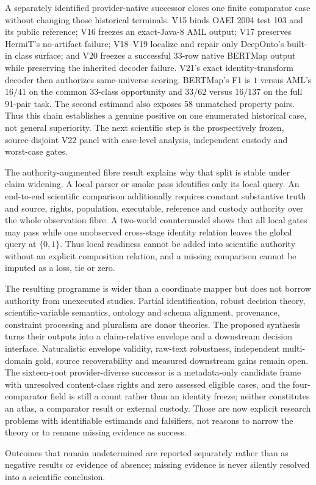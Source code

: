 A separately identified provider-native successor closes one finite comparator
case without changing those historical terminals. V15 binds OAEI 2004 test 103
and its public reference; V16 freezes an exact-Java-8 AML output; V17 preserves
HermiT's no-artifact failure; V18--V19 localize and repair only DeepOnto's
built-in class surface; and V20 freezes a successful 33-row native BERTMap
output while preserving the inherited decoder failure. V21's exact
identity-transform decoder then authorizes same-universe scoring. BERTMap's F1
is $1$ versus AML's $16/41$ on the common 33-class opportunity and $33/62$
versus $16/137$ on the full 91-pair task. The second estimand also exposes 58
unmatched property pairs. Thus this chain establishes a genuine positive on
one enumerated historical case, not general superiority. The next scientific
step is the prospectively frozen, source-disjoint V22 panel with case-level
analysis, independent custody and worst-case gates.

The authority-augmented fibre result explains why that split is stable under
claim widening.  A local parser or smoke pass identifies only its local query.
An end-to-end scientific comparison additionally requires constant substantive
truth and source, rights, population, executable, reference and custody
authority over the whole observation fibre.  A two-world countermodel shows
that all local gates may pass while one unobserved cross-stage identity
relation leaves the global query at $\{0,1\}$.  Thus local readiness cannot be
added into scientific authority without an explicit composition relation, and
a missing comparison cannot be imputed as a loss, tie or zero.

The resulting programme is wider than a coordinate mapper but does not borrow
authority from unexecuted studies. Partial identification, robust decision
theory, scientific-variable semantics, ontology and schema alignment,
provenance, constraint processing and pluralism are donor theories. The
proposed synthesis turns their outputs into a claim-relative envelope and a
downstream decision interface. Naturalistic envelope validity, raw-text
robustness, independent multi-domain gold, source recoverability and measured
downstream gains remain open. The sixteen-root provider-diverse successor is a
metadata-only candidate frame with unresolved content-class rights and zero
assessed eligible cases, and the four-comparator field is still a count rather
than an identity freeze; neither constitutes an atlas, a comparator result or
external custody.
Those are now explicit research problems with identifiable estimands and
falsifiers, not reasons to narrow the theory or to rename missing evidence as
success.

Outcomes that remain undetermined are reported separately rather than as
negative results or evidence of absence; missing evidence is never silently
resolved into a scientific conclusion.

\endinput
